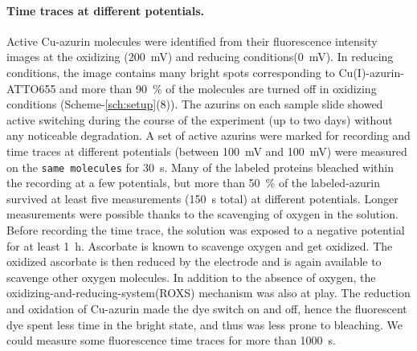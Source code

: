 \documentclass[journal=jacsat,manuscript=article]{achemso}
\begin{document}
\paragraph*{Time traces at different potentials.}
Active Cu-azurin molecules were identified from their fluorescence intensity images at the oxidizing (\SI{200}{\mV}) and reducing conditions(\SI{0}{\mV}).
In reducing conditions, the image contains many bright spots corresponding to Cu(I)-azurin-ATTO655 and more than \SI{90}{\percent} of the molecules are turned off in oxidizing conditions 
(Scheme-\ref{sch:setup}(8)).
The azurins on each sample slide showed active switching during the course of the experiment (up to two days) without any noticeable degradation.
A set of active azurins were marked for recording and time traces at different potentials (between \SI{100}{\mV} and \SI{100}{\mV}) were measured on the \texttt{same molecules} 
for \SI{30}{\s}.
Many of the labeled proteins bleached within the recording at a few potentials, but more than \SI{50}{\percent} of the labeled-azurin survived at least five measurements (\SI{150}{\s}  total) at different potentials.
Longer measurements were possible thanks to the scavenging of oxygen in the solution.
Before recording the time trace, the solution was exposed to a negative potential for at least \SI{1}{\hour}.
Ascorbate is known to  scavenge oxygen\cite{dave1997effectiveness} and get oxidized.
The oxidized ascorbate is then reduced by the electrode and is again available to scavenge other oxygen molecules.
In addition to the absence of oxygen, the  oxidizing-and-reducing-system(ROXS) mechanism was also at play.\cite{cordes2009on}
The reduction and oxidation of Cu-azurin made the dye switch on and off, hence the fluorescent dye spent less time in the bright state, and thus was less prone to bleaching.
We could measure some fluorescence time traces for more than \SI{1000}{\s}.\\
\end{document}
